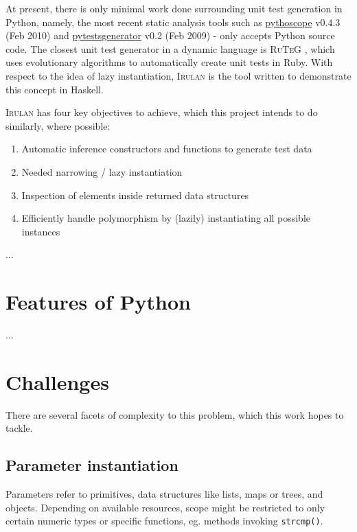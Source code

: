 \documentclass{icldt}
\numberwithin{equation}{section}       %
\begin{document}
At present, there is only minimal work done surrounding unit test generation in Python, namely, the most recent static analysis tools such as \href{http://pythoscope.org/tutorial}{\textsf{pythoscope}} v0.4.3 (Feb 2010) and \href{http://code.google.com/p/pytestsgenerator}{\textsf{pytestsgenerator}} v0.2 (Feb 2009) - only accepts Python source code. The closest unit test generator in a dynamic language is \textsc{RuTeG} \cite{Mairhofer2011}, which uses evolutionary algorithms to automatically create unit tests in Ruby. With respect to the idea of lazy instantiation, \textsc{Irulan} \cite{Allwood2011} is the tool written to demonstrate this concept in Haskell.

\textsc{Irulan} has four key objectives to achieve, which this project intends to do similarly, where possible:
\begin{enumerate}[1.]
	\item Automatic inference constructors and functions to generate test data
	\item Needed narrowing / lazy instantiation
	\item Inspection of elements inside returned data structures
	\item Efficiently handle polymorphism by (lazily) instantiating all possible instances
\end{enumerate}
...
\section{Features of Python}
\label{sect:python-features}
...
\section{Challenges}
\label{sect:challenges}
There are several facets of complexity to this problem, which this work hopes to tackle.
\subsection{Parameter instantiation}
Parameters refer to primitives, data structures like lists, maps or trees, and objects. Depending on available resources, scope might be restricted to only certain numeric types or specific functions, eg. methods invoking \texttt{strcmp()}.
\end{document}
